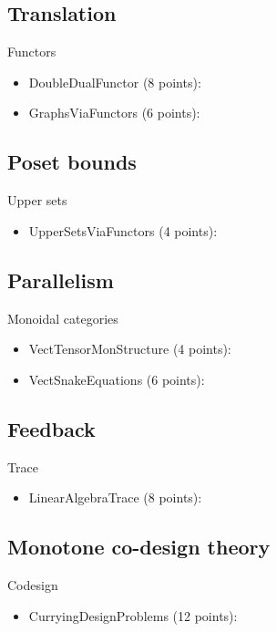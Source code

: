\subsection{Translation}

Functors
\begin{itemize}
    \item DoubleDualFunctor (8 points): 
    \item GraphsViaFunctors (6 points): 
\end{itemize}

\subsection{Poset bounds}
Upper sets
\begin{itemize}
    \item UpperSetsViaFunctors (4 points): 
\end{itemize}

\subsection{Parallelism}

Monoidal categories
\begin{itemize}
    \item VectTensorMonStructure (4 points): 
    \item VectSnakeEquations (6 points): 
\end{itemize}

\subsection{Feedback}

Trace
\begin{itemize}
    \item LinearAlgebraTrace (8 points): 
\end{itemize}

\subsection{Monotone co-design theory}

Codesign
\begin{itemize}
    \item CurryingDesignProblems (12 points): 
\end{itemize}

